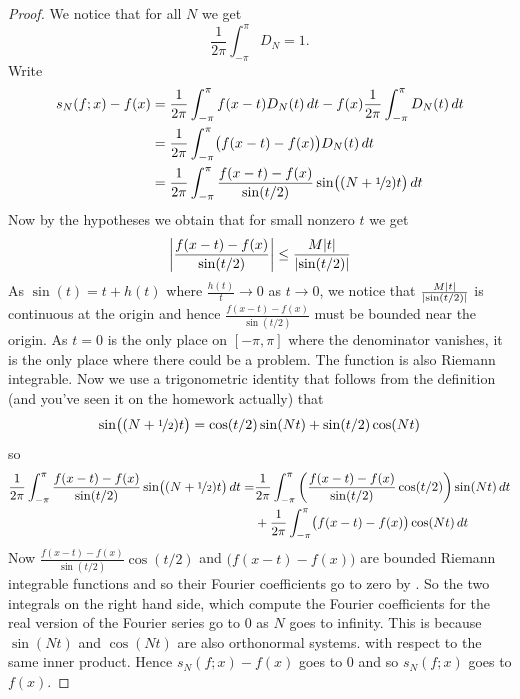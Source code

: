 \begin{proof}
We notice that for all $N$ we get
\begin{equation*}
\frac{1}{2\pi} \int_{-\pi}^\pi D_N = 1 .
\end{equation*}
Write
\begin{equation*}
\begin{split}
s_N(f;x)-f(x) & =
\frac{1}{2\pi} \int_{-\pi}^\pi f(x-t) D_N(t) \, dt 
-
f(x)
\frac{1}{2\pi} \int_{-\pi}^\pi D_N(t) \, dt
\\
& = 
\frac{1}{2\pi} \int_{-\pi}^\pi \bigl( f(x-t) - f(x) \bigr) D_N(t) \, dt 
\\
& = 
\frac{1}{2\pi} \int_{-\pi}^\pi \frac{f(x-t) - f(x)}{\sin(t/2)} \sin\bigl(
(N+\nicefrac{1}{2})t \bigr) \, dt 
\end{split}
\end{equation*}
Now by the hypotheses we obtain that
for small nonzero $t$ we get
\begin{equation*}
\left\lvert { \frac{f(x-t) - f(x)}{\sin(t/2)} } \right\rvert
\leq
\frac{M\lvert {t} \rvert}{\lvert {\sin(t/2)} \rvert}
\end{equation*}
As $\sin(t) = t + h(t)$ where $\frac{h(t)}{t} \to 0$ as $t \to 0$,
we notice that
$\frac{M\lvert {t} \rvert}{\lvert {\sin(t/2)} \rvert}$ is continuous at the origin
and hence 
$\frac{f(x-t) - f(x)}{\sin(t/2)}$ must be bounded near the origin.
As $t=0$ is the only place on $[-\pi,\pi]$ where the denominator vanishes,
it is the only place where there could be a problem.  The function is
also Riemann integrable.  Now we use a trigonometric identity
that follows from the definition (and you've seen it on the homework
actually) that 
\begin{equation*}
\sin\bigl( (N+\nicefrac{1}{2})t \bigr)
=
\cos(t/2) \sin(Nt) + 
\sin(t/2) \cos(Nt)
\end{equation*}
so
\begin{equation*}
\begin{split}
\frac{1}{2\pi} \int_{-\pi}^\pi \frac{f(x-t) - f(x)}{\sin(t/2)} \sin\bigl(
(N+\nicefrac{1}{2})t \bigr) \, dt 
=
&
\frac{1}{2\pi} \int_{-\pi}^\pi
\left( \frac{f(x-t) - f(x)}{\sin(t/2)}
\cos (t/2) \right) \sin (Nt) \, dt
\\
& +
\frac{1}{2\pi} \int_{-\pi}^\pi \bigl( f(x-t) - f(x) \bigr)
\cos (Nt) \, dt
\end{split}
\end{equation*}
Now 
$\frac{f(x-t) - f(x)}{\sin(t/2)} \cos (t/2)$
and
$\bigl( f(x-t) - f(x) \bigr)$ are bounded Riemann integrable functions
and so their Fourier coefficients go to zero by .  So the two
integrals on the right hand side, which compute the Fourier coefficients
for the real version of the Fourier series go to 0 as $N$ goes to infinity.
This is because $\sin(Nt)$ and $\cos(Nt)$ are also orthonormal systems.
with respect to the same inner product.
Hence $s_N(f;x)-f(x)$ goes to 0 and so $s_N(f;x)$ goes to $f(x)$.
\end{proof}

